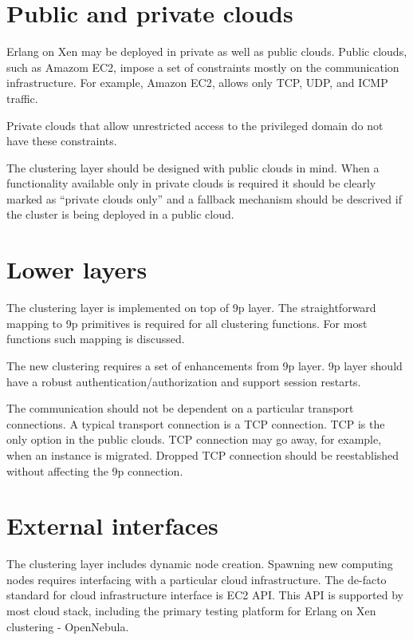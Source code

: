 \documentclass{scrartcl}
\begin{document}
\section*{Public and private clouds}

Erlang on Xen may be deployed in private as well as public clouds. Public
clouds, such as Amazom EC2, impose a set of constraints mostly on the
communication infrastructure. For example, Amazon EC2, allows only TCP, UDP, and
ICMP traffic.

Private clouds that allow unrestricted access to the privileged domain do not
have these constraints.

The clustering layer should be designed with public clouds in mind. When a
functionality available only in private clouds is required it should be clearly
marked as ``private clouds only'' and a fallback mechanism should be descrived
if the cluster is being deployed in a public cloud.

\section*{Lower layers}

The clustering layer is implemented on top of 9p layer. The straightforward
mapping to 9p primitives is required for all clustering functions. For most
functions such mapping is discussed.

The new clustering requires a set of enhancements from 9p layer. 9p layer should
have a robust authentication/authorization and support session restarts.

The communication should not be dependent on a particular transport connections.
A typical transport connection is a TCP connection. TCP is the only option in
the public clouds. TCP connection may go away, for example, when an instance is
migrated. Dropped TCP connection should be reestablished without affecting the 9p
connection.

\section*{External interfaces}

The clustering layer includes dynamic node creation. Spawning new computing
nodes requires interfacing with a particular cloud infrastructure. The de-facto
standard for cloud infrastructure interface is EC2 API. This API is supported by
most cloud stack, including the primary testing platform for Erlang on Xen
clustering - OpenNebula.
\end{document}
